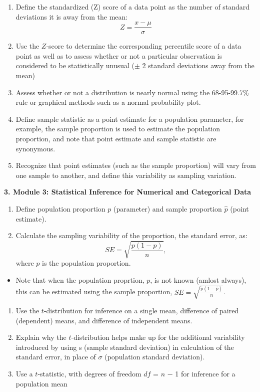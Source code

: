 \documentclass[
]{article}
\providecommand{\tightlist}{%
  \setlength{\itemsep}{0pt}\setlength{\parskip}{0pt}}
\begin{document}
\begin{enumerate}
\def\labelenumi{\arabic{enumi}.}
\tightlist
\item
  Define the standardized (Z) score of a data point as the number of
  standard deviations it is away from the mean:
  \[Z = \frac{x-\mu}{\sigma}\]
\item
  Use the \(Z\)-score to determine the corresponding percentile score of
  a data point as well as to assess whether or not a particular
  observation is considered to be statistically unusual (\(\pm\) 2
  standard deviations away from the mean)
\item
  Assess whether or not a distribution is nearly normal using the
  68-95-99.7\% rule or graphical methods such as a normal probability
  plot.
\item
  Define sample statistic as a point estimate for a population
  parameter, for example, the sample proportion is used to estimate the
  population proportion, and note that point estimate and sample
  statistic are synonymous.
\item
  Recognize that point estimates (such as the sample proportion) will
  vary from one sample to another, and define this variability as
  sampling variation.
\end{enumerate}

\vspace{.25cm}

\textbf{3. Module 3: Statistical Inference for Numerical and Categorical
Data}

\begin{enumerate}
\def\labelenumi{\arabic{enumi}.}
\tightlist
\item
  Define population proportion \(p\) (parameter) and sample proportion
  \(\hat{p}\) (point estimate).
\item
  Calculate the sampling variability of the proportion, the standard
  error, as: \[ SE= \sqrt{\frac{p(1-p)}{n}}, \] where \(p\) is the
  population proportion.
\end{enumerate}

\begin{itemize}
\tightlist
\item
  Note that when the population proprtion, \(p\), is not known (amlost
  always), this can be estimated using the sample proportion,
  \(SE = \sqrt{\frac{\hat{p}(1-\hat{p})}{n}}\).
\end{itemize}

\begin{enumerate}
\def\labelenumi{\arabic{enumi}.}
\setcounter{enumi}{2}
\tightlist
\item
  Use the \(t\)-distribution for inference on a single mean, difference
  of paired (dependent) means, and difference of independent means.
\item
  Explain why the \(t\)-distribution helps make up for the additional
  variability introduced by using s (sample standard deviation) in
  calculation of the standard error, in place of \(\sigma\) (population
  standard deviation).
\item
  Use a \(t\)-statistic, with degrees of freedom \(df\) = \(n\) − 1 for
  inference for a population mean
\end{enumerate}
\end{document}
